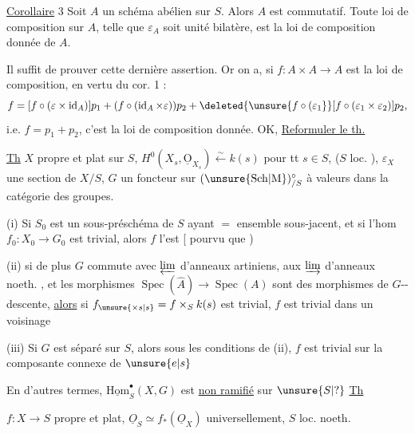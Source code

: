 \uline{Corollaire} 3 Soit $A$ un schéma abélien sur $S$. Alors $A$ est commutatif. Toute loi de composition sur $A$, telle que $\varepsilon_A$  soit unité bilatère, est la loi de composition donnée de $A$.

Il suffit de prouver cette dernière assertion. Or on a, si $f:A\times A\longrightarrow A$ est la loi de composition, en vertu du cor. 1 :
\[
f=[f\circ(\varepsilon\times\operatorname{id}_A)]p_1+
(f\circ(\operatorname{id}_A\times\varepsilon))p_2+
\deleted{\unsure{f\circ(\varepsilon_1}}[f\circ(\varepsilon_1\times\varepsilon_2)]p_2,
\]
i.e. $f=p_1+p_2$, c'est la loi de composition donnée. OK,
\uline{Reformuler le th.}

\uline{Th} $X$ propre et plat sur $S$, $H^0(X_s,\underline{\mathrm O}_{X_s})\xleftarrow{\sim}k(s)$ pour tt $s\in S$, ($S$ loc. ), $\varepsilon_X$ une section de $X/S$,  $G$ un foncteur sur $(\unsure{\mathrm{Sch}|\mathrm M})_{/S}^{\circ}$ à valeurs dans la catégorie des groupes.   

(i) Si $S_0$ est un sous-préschéma  de $S$ ayant $=$ ensemble sous-jacent, et si  l'hom $f_0:X_0\longrightarrow G_0$ est trivial, alors $f$ l'est [ pourvu que  )

(ii) si de plus $G$ commute avec $\varprojlim$ d'anneaux artiniens, aux $\varinjlim$ d'anneaux noeth. , et  les morphismes $\operatorname{Spec}(\widehat A)\longrightarrow\operatorname{Spec}(A)$ sont des morphismes de $G$--descente, \uline{alors} si $f_{\unsure{\times s|s}}=f\times_S k(s)$ est trivial, $f$ est trivial dans un voisinage

(iii) Si $G$ est séparé sur $S$, alors sous les conditions de (ii),  $f$ est trivial sur la composante connexe de $\unsure{e|s}$

En d'autres termes, $\underline{\mathrm{Hom}}_S^{\bullet}(X,G)$ est \uline{non ramifié} sur $\unsure{S|?}$
\uline{Th}

$f:X\longrightarrow S$ propre et plat, $\underline O_S\simeq f_*(\underline O_X)$ universellement, $S$ loc. noeth.

